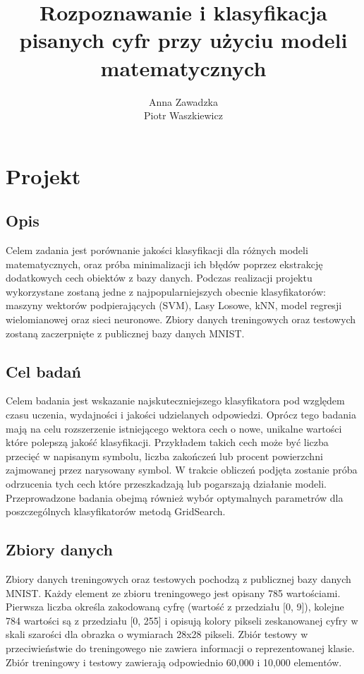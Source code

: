 \documentclass[]{report}
\title{ Rozpoznawanie i klasyfikacja pisanych cyfr przy użyciu modeli matematycznych  }
\author{Anna Zawadzka \\ Piotr Waszkiewicz}
\begin{document}
\maketitle

\chapter{Projekt}


\section{Opis}

Celem zadania jest porównanie jakości klasyfikacji dla różnych modeli matematycznych, oraz próba minimalizacji ich błędów poprzez ekstrakcję dodatkowych cech obiektów z bazy danych. Podczas realizacji projektu wykorzystane zostaną jedne z najpopularniejszych obecnie klasyfikatorów: maszyny wektorów podpierających (SVM), Lasy Losowe, kNN, model regresji wielomianowej oraz sieci neuronowe. Zbiory danych treningowych oraz testowych zostaną zaczerpnięte z publicznej bazy danych MNIST\cite{mnist_database}. \\


\section{Cel badań}

Celem badania jest wskazanie najskuteczniejszego klasyfikatora pod względem czasu uczenia, wydajności i jakości udzielanych odpowiedzi. Oprócz tego badania mają na celu rozszerzenie istniejącego wektora cech o nowe, unikalne wartości które polepszą jakość klasyfikacji. Przykładem takich cech może być liczba przecięć w napisanym symbolu, liczba zakończeń lub procent powierzchni zajmowanej przez narysowany symbol. W trakcie obliczeń podjęta zostanie próba odrzucenia tych cech które przeszkadzają lub pogarszają działanie modeli. Przeprowadzone badania obejmą również wybór optymalnych parametrów dla poszczególnych klasyfikatorów metodą GridSearch\cite{gridsearch}. \\


\section{Zbiory danych}

Zbiory danych treningowych oraz testowych pochodzą z publicznej bazy danych MNIST\cite{mnist_database}. Każdy element ze zbioru treningowego jest opisany 785 wartościami. Pierwsza liczba określa zakodowaną cyfrę (wartość z przedziału [0, 9]), kolejne 784 wartości są z przedziału [0, 255] i opisują kolory pikseli zeskanowanej cyfry w skali szarości dla obrazka o wymiarach 28x28 pikseli. Zbiór testowy w przeciwieństwie do treningowego nie zawiera informacji o reprezentowanej klasie. Zbiór treningowy i testowy zawierają odpowiednio 60,000 i 10,000 elementów. \\
\end{document}
